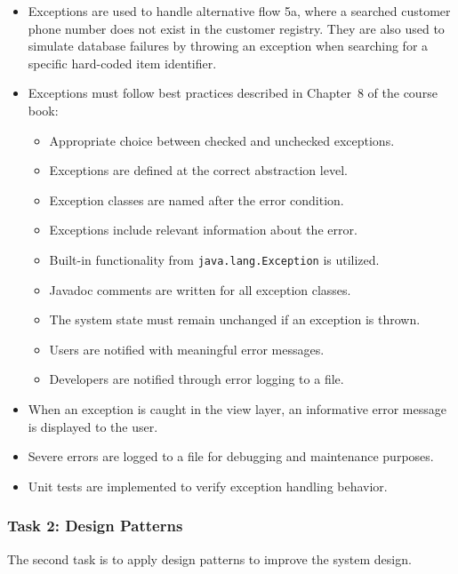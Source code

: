 \documentclass[a4paper]{scrartcl}
\begin{document}
\begin{itemize}
    \item Exceptions are used to handle alternative flow 5a, where a searched customer phone number does not exist in the customer registry. They are also used to simulate database failures by throwing an exception when searching for a specific hard-coded item identifier.
    
    \item Exceptions must follow best practices described in Chapter~8 of the course book:
    \begin{itemize}
        \item Appropriate choice between checked and unchecked exceptions.
        \item Exceptions are defined at the correct abstraction level.
        \item Exception classes are named after the error condition.
        \item Exceptions include relevant information about the error.
        \item Built-in functionality from \texttt{java.lang.Exception} is utilized.
        \item Javadoc comments are written for all exception classes.
        \item The system state must remain unchanged if an exception is thrown.
        \item Users are notified with meaningful error messages.
        \item Developers are notified through error logging to a file.
    \end{itemize}
    \item When an exception is caught in the view layer, an informative error message is displayed to the user.
    \item Severe errors are logged to a file for debugging and maintenance purposes.
    \item Unit tests are implemented to verify exception handling behavior.
\end{itemize}

\subsubsection*{Task 2: Design Patterns}

The second task is to apply design patterns to improve the system design.
\end{document}
